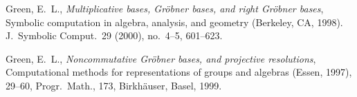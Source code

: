 \documentclass{amsart}
\theoremstyle{definition}
\theoremstyle{theoretic}
\begin{document}
\begin{thebibliography}{99}
 Green, E.\ L., \emph{Multiplicative bases, Gr\"obner
    bases, and right Gr\"obner bases}, Symbolic  computation in
  algebra, analysis, and geometry (Berkeley, CA, 1998).  J.\ Symbolic
  Comput.\  29 (2000), no.\  4--5, 601--623. 

  Green, E.\  L., \emph{Noncommutative Gr\"obner
    bases, and projective resolutions}, Computational methods for
  representations of groups and algebras (Essen, 1997), 29--60,
  Progr.\  Math., 173, Birkh\"auser, Basel, 1999.
\end{thebibliography}
\end{document}
